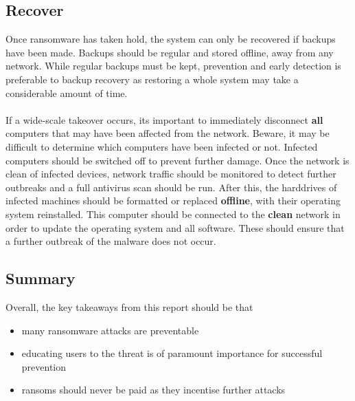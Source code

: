 \documentclass{article}
\begin{document}
\subsection{Recover}
Once ransomware has taken hold, the system can only be recovered if backups have been made. Backups should be regular and stored offline, away from any network.
While regular backups must be kept, prevention and early detection is preferable to backup recovery as restoring a whole system may take a considerable amount of time.
\\\\
If a wide-scale takeover occurs, its important to immediately disconnect \textbf{all} computers that may have been affected from the network. Beware, it may be difficult to determine which computers have been infected or not.
Infected computers should be switched off to prevent further damage.
Once the network is clean of infected devices, network traffic should be monitored to detect further outbreaks and a full antivirus scan should be run.
After this, the harddrives of infected machines should be formatted or replaced \textbf{offline}, with their operating system reinstalled. This computer should be connected to the \textbf{clean} network in order to update the operating system and all software. These should ensure that a further outbreak of the malware does not occur.\cite{ncsc_mitigating_malware}

\subsection{Summary}
Overall, the key takeaways from this report should be that 
\begin{itemize}
	\item many ransomware attacks are preventable
	\item educating users to the threat is of paramount importance for successful prevention
	\item ransoms should never be paid as they incentise further attacks
\end{itemize}
\end{document}
